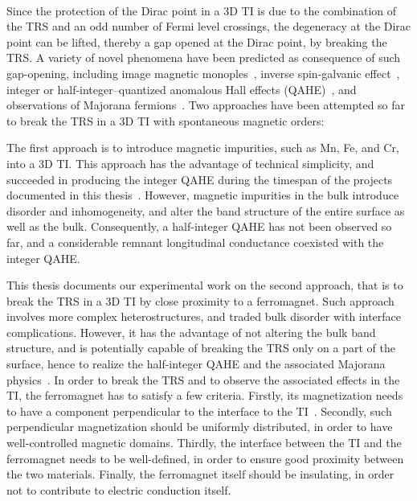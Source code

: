 \paragraph{}
Since the protection of the Dirac point in a 3D TI is due to the combination of the TRS and an odd number of Fermi level crossings, the degeneracy at the Dirac point can be lifted, thereby a gap opened at the Dirac point, by breaking the TRS. A variety of novel phenomena have been predicted as consequence of such gap-opening, including image magnetic monoples~\cite{TI_birth, TI_monopole}, inverse spin-galvanic effect~\cite{ISG}, integer or half-integer--quantized anomalous Hall effects (QAHE)~\cite{TI_Col, QAH_TI_Yu}, and observations of Majorana fermions~\cite{Akhmerov2009, TI_Majorana}. Two approaches have been attempted so far to break the TRS in a 3D TI with spontaneous magnetic orders:

The first approach is to introduce magnetic impurities, such as Mn, Fe, and Cr, into a 3D TI. This approach has the advantage of technical simplicity, and succeeded in producing the integer QAHE during the timespan of the projects documented in this thesis~\cite{Chang2013, Kou2014}. However, magnetic impurities in the bulk introduce disorder and inhomogeneity, and alter the band structure of the entire surface as well as the bulk. Consequently, a half-integer QAHE has not been observed so far, and a considerable remnant longitudinal conductance coexisted with the integer QAHE.

This thesis documents our experimental work on the second approach, that is to break the TRS in a 3D TI by close proximity to a ferromagnet. Such approach involves more complex heterostructures, and traded bulk disorder with interface complications. However, it has the advantage of not altering the bulk band structure, and is potentially capable of breaking the TRS only on a part of the surface, hence to realize the half-integer QAHE and the associated Majorana physics~\cite{TI_Qi, TI_Col}. In order to break the TRS and to observe the associated effects in the TI, the ferromagnet has to satisfy a few criteria. Firstly, its magnetization needs to have a component perpendicular to the interface to the TI~\cite{MnSe}. Secondly, such perpendicular magnetization should be uniformly distributed, in order to have well-controlled magnetic domains. Thirdly, the interface between the TI and the ferromagnet needs to be well-defined, in order to ensure good proximity between the two materials. Finally, the ferromagnet itself should be insulating, in order not to contribute to electric conduction itself.

